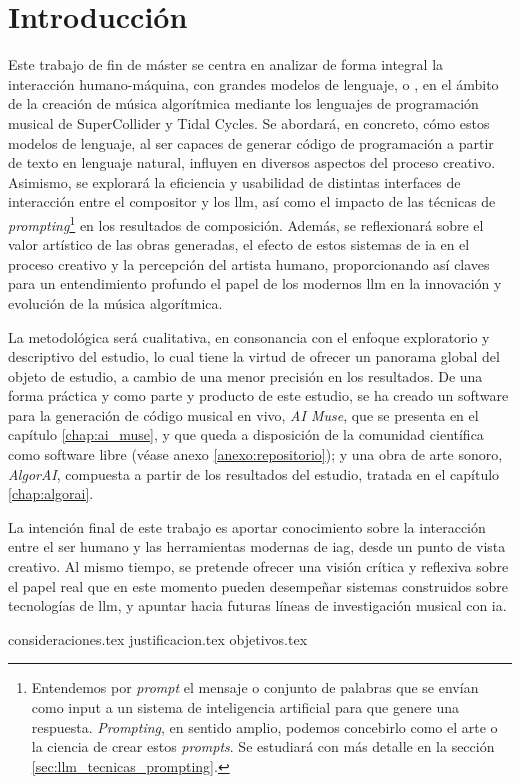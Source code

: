 \chapter{Introducción}



Este trabajo de fin de máster se centra en analizar de forma integral la interacción humano-máquina, con grandes modelos de lenguaje, o , en el ámbito de la creación de música algorítmica mediante los lenguajes de programación musical de SuperCollider y Tidal Cycles. Se abordará, en concreto, cómo estos modelos de lenguaje, al ser capaces de generar código de programación a partir de texto en lenguaje natural, influyen en diversos aspectos del proceso creativo. Asimismo, se explorará la eficiencia y usabilidad de distintas interfaces de interacción entre el compositor y los \gls{llm}, así como el impacto de las técnicas de \emph{prompting}\footnote{Entendemos por \emph{prompt} el mensaje o conjunto de palabras que se envían como input a un sistema de inteligencia artificial para que genere una respuesta. \emph{Prompting}, en sentido amplio, podemos concebirlo como el arte o la ciencia de crear estos \emph{prompts}. Se estudiará con más detalle en la sección \ref{sec:llm_tecnicas_prompting}.} en los resultados de composición. Además, se reflexionará sobre el valor artístico de las obras generadas, el efecto de estos sistemas de \gls{ia} en el proceso creativo y la percepción del artista humano, proporcionando así claves para un entendimiento profundo el papel de los modernos \gls{llm} en la innovación y evolución de la música algorítmica.

La metodológica será cualitativa, en consonancia con el enfoque exploratorio y descriptivo del estudio, lo cual tiene la virtud de ofrecer un panorama global del objeto de estudio, a cambio de una menor precisión en los resultados. De una forma práctica y como parte y producto de este estudio, se ha creado un software para la generación de código musical en vivo, \emph{AI Muse}, que se presenta en el capítulo \ref{chap:ai_muse}, y que queda a disposición de la comunidad científica como software libre (véase anexo \ref{anexo:repositorio}); y una obra de arte sonoro, \emph{AlgorAI}, compuesta a partir de los resultados del estudio, tratada en el capítulo \ref{chap:algorai}.

La intención final de este trabajo es aportar conocimiento sobre la interacción entre el ser humano y las herramientas modernas de \gls{iag}, desde un punto de vista creativo. Al mismo tiempo, se pretende ofrecer una visión crítica y reflexiva sobre el papel real que en este momento pueden desempeñar sistemas construidos sobre tecnologías de \gls{llm}, y apuntar hacia futuras líneas de investigación musical con \gls{ia}.



{consideraciones.tex}
{justificacion.tex}
{objetivos.tex}